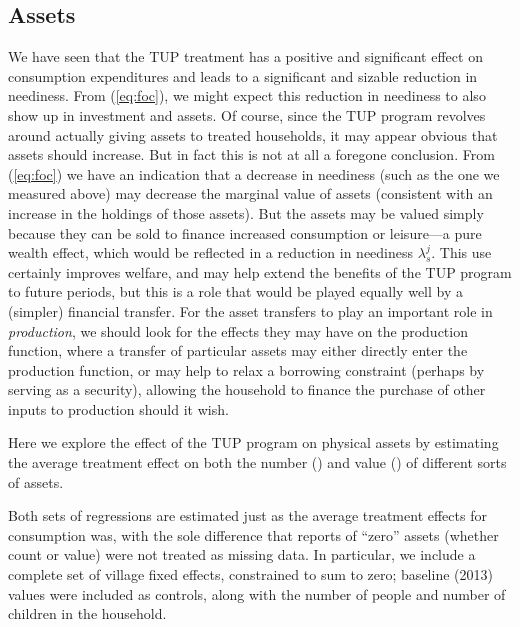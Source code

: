\documentclass[11pt]{article}
\newcommand{\Eq}[1]{(\ref{eq:#1})}
\begin{document}
\subsection*{Assets}
\label{sec-8-1}

We have seen that the TUP treatment has a positive and significant
effect on consumption expenditures and leads to a significant and
sizable reduction in neediness.  From \Eq{foc}, we might expect this
reduction in neediness to also show up in investment and assets.  Of
course, since the TUP program revolves around actually giving assets
to treated households, it may appear obvious that assets should
increase.  But in fact this is not at all a foregone conclusion.  From
\Eq{foc} we have an indication that a decrease in neediness (such as
the one we measured above) may decrease the marginal value of assets
(consistent with an increase in the holdings of those assets).  But
the assets may be valued simply because they can be sold to finance
increased consumption or leisure---a pure wealth effect, which would
be reflected in a reduction in neediness $\lambda^j_s$.  This use
certainly improves welfare, and may help extend the benefits of the
TUP program to future periods, but this is a role that would be played
equally well by a (simpler) financial transfer.  For the asset
transfers to play an important role in \emph{production}, we should look
for the effects they may have on the production function, where a
transfer of particular assets may either directly enter the production
function, or may help to relax a borrowing constraint (perhaps by
serving as a security), allowing the household to finance the purchase
of other inputs to production should it wish.

Here we explore the effect of the TUP program on physical assets by
estimating the average treatment effect on both the number
() and value () of
different sorts of assets.

Both sets of regressions are estimated just as the average treatment
effects for consumption was, with the sole difference that reports of
``zero'' assets (whether count or value) were not treated as missing
data.  In particular, we include a complete set of village fixed
effects, constrained to sum to zero; baseline (2013) values were
included as controls, along with the number of people and number of
children in the household.
\end{document}
